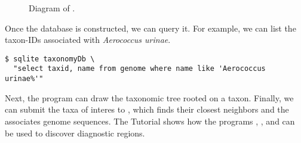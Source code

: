 \begin{figure}
  \begin{center}
    
  \end{center}
  \caption{Diagram of .}\label{fig:db}
\end{figure}

Once the database is constructed, we can query it. For example, we
can list the taxon-IDs associated with \emph{Aerococcus urinae}.
\begin{verbatim}
$ sqlite taxonomyDb \
  "select taxid, name from genome where name like 'Aerococcus urinae%'"
\end{verbatim}
Next, the program  can draw the taxonomic tree rooted on a
taxon. Finally, we can submit the taxa of interes to \ty{neighbors},
which finds their closest neighbors and the associates genome
sequences. The Tutorial shows how the
programs , , and  can be used to
discover diagnostic regions.

